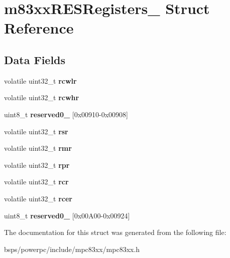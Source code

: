 \hypertarget{structm83xxRESRegisters__}{}\section{m83xx\+R\+E\+S\+Registers\+\_\+ Struct Reference}
\label{structm83xxRESRegisters__}
\subsection*{Data Fields}
\begin{DoxyCompactItemize}
\item 
\mbox{\label{structm83xxRESRegisters___a514839c9e94795e81287971231233923}} 
volatile uint32\+\_\+t {\bfseries rcwlr}
\item 
\mbox{\label{structm83xxRESRegisters___ac01fd9368619755348d7f92a0d9a3b1a}} 
volatile uint32\+\_\+t {\bfseries rcwhr}
\item 
\mbox{\label{structm83xxRESRegisters___a7937793a557c893273a8a91213950464}} 
uint8\+\_\+t {\bfseries reserved0\+\_} \mbox{[}0x00910-\/0x00908\mbox{]}
\item 
\mbox{\label{structm83xxRESRegisters___ae609bbbf191178c084dfcb4afbefe662}} 
volatile uint32\+\_\+t {\bfseries rsr}
\item 
\mbox{\label{structm83xxRESRegisters___ae02a1da195b8807d3196c52146e97030}} 
volatile uint32\+\_\+t {\bfseries rmr}
\item 
\mbox{\label{structm83xxRESRegisters___af92baeca535842bcaa60a3238fd7dac8}} 
volatile uint32\+\_\+t {\bfseries rpr}
\item 
\mbox{\label{structm83xxRESRegisters___a24396fd5b4b6c1885a541dd5aaa71197}} 
volatile uint32\+\_\+t {\bfseries rcr}
\item 
\mbox{\label{structm83xxRESRegisters___a526d9da684eed98bfcc537c2f0ca5e9f}} 
volatile uint32\+\_\+t {\bfseries rcer}
\item 
\mbox{\label{structm83xxRESRegisters___aac574470c9c92ad10b1bd336fb2580c7}} 
uint8\+\_\+t {\bfseries reserved0\+\_} \mbox{[}0x00\+A00-\/0x00924\mbox{]}
\end{DoxyCompactItemize}


The documentation for this struct was generated from the following file\+:\begin{DoxyCompactItemize}
\item 
bsps/powerpc/include/mpc83xx/mpc83xx.\+h\end{DoxyCompactItemize}
